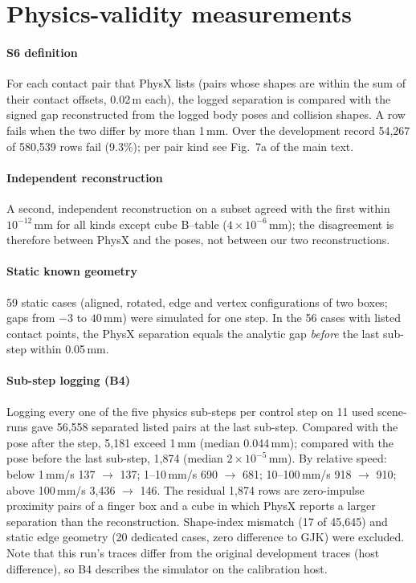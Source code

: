 \documentclass[preprint,12pt]{elsarticle}
\begin{document}
\section{Physics-validity measurements}\label{sec:s-physics}

\paragraph{S6 definition} For each contact pair that PhysX lists (pairs whose shapes are within the sum of their contact offsets, 0.02\,m each), the logged separation is compared with the signed gap reconstructed from the logged body poses and collision shapes. A row fails when the two differ by more than 1\,mm. Over the development record 54,267 of 580,539 rows fail (9.3\%); per pair kind see Fig.~7a of the main text.

\paragraph{Independent reconstruction} A second, independent reconstruction on a subset agreed with the first within $10^{-12}$\,mm for all kinds except cube B--table ($4\times10^{-6}$\,mm); the disagreement is therefore between PhysX and the poses, not between our two reconstructions.

\paragraph{Static known geometry} 59 static cases (aligned, rotated, edge and vertex configurations of two boxes; gaps from $-3$ to $40$\,mm) were simulated for one step. In the 56 cases with listed contact points, the PhysX separation equals the analytic gap \emph{before} the last sub-step within 0.05\,mm.

\paragraph{Sub-step logging (B4)} Logging every one of the five physics sub-steps per control step on 11 used scene-runs gave 56,558 separated listed pairs at the last sub-step. Compared with the pose after the step, 5,181 exceed 1\,mm (median 0.044\,mm); compared with the pose before the last sub-step, 1,874 (median $2\times10^{-5}$\,mm). By relative speed: below 1\,mm/s 137 $\to$ 137; 1--10\,mm/s 690 $\to$ 681; 10--100\,mm/s 918 $\to$ 910; above 100\,mm/s 3,436 $\to$ 146. The residual 1,874 rows are zero-impulse proximity pairs of a finger box and a cube in which PhysX reports a larger separation than the reconstruction. Shape-index mismatch (17 of 45,645) and static edge geometry (20 dedicated cases, zero difference to GJK) were excluded. Note that this run's traces differ from the original development traces (host difference), so B4 describes the simulator on the calibration host.
\end{document}

